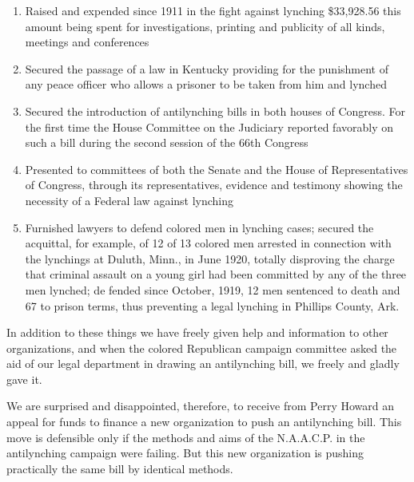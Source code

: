 \documentclass[letterpaper,10pt,english]{jupyterBook}
\begin{document}
\begin{enumerate}
\item {} 
\sphinxAtStartPar
Raised and expended since 1911 in the fight against lynching \$33,928.56 this amount being spent for investigations, printing and publicity of all kinds, meetings and conferences

\item {} 
\sphinxAtStartPar
Secured the passage of a law in Kentucky providing for the punishment of any peace officer who allows a prisoner to be taken from him and lynched

\item {} 
\sphinxAtStartPar
Secured the introduction of anti\sphinxhyphen{}lynching bills in both houses of Congress. For the first time the House Committee on the Judiciary reported favorably on such a bill during the second ses­sion of the 66th Congress

\item {} 
\sphinxAtStartPar
Presented to committees of both the Senate and the House of Representatives of Congress, through its representatives, evidence and testimony showing the necessity of a Federal law against lynching

\item {} 
\sphinxAtStartPar
Furnished lawyers to defend colored men in lynching cases; secured the acquittal, for example, of 12 of 13 colored men arrested in connection with the lynchings at Duluth, Minn., in June 1920, totally disproving the charge that criminal assault on a young girl had been com­mitted by any of the three men lynched; de­ fended since October, 1919, 12 men sentenced to death and 67 to prison terms, thus preventing a legal lynching in Phillips County, Ark.

\end{enumerate}

\sphinxAtStartPar
In addition to these things we have freely given help and information to other organizations, and when the colored Republican campaign committee asked the aid of our legal department in drawing an anti\sphinxhyphen{}lynching bill, we freely and gladly gave it.

\sphinxAtStartPar
We are surprised and disappointed, therefore, to receive from Perry Howard an appeal for funds to finance a new organization to push an anti\sphinxhyphen{}lynching bill. This move is defensible only if the methods and aims of the N.A.A.C.P. in the anti\sphinxhyphen{}lynching campaign were failing. But this new organization is pushing practically the same bill by identical methods.
\end{document}
